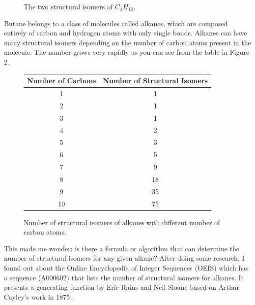 \documentclass{article}
\begin{document}
\begin{figure}[ht!]
\caption{The two structural isomers of $C_4H_{10}$.}
\end{figure}
Butane belongs to a class of molecules called alkanes, which are composed entirely of carbon and hydrogen atoms
with only single bonds. Alkanes can have many structural isomers depending on the
number of carbon atoms present in the molecule.
The number grows very rapidly as you can see from the table in Figure 2.
\begin{figure}[ht!]
\centering
\begin{tabular}{|c|c|}
\hline
Number of Carbons & Number of Structural Isomers \\
\hline
1 & 1 \\
2 & 1 \\
3 & 1 \\
4 & 2 \\
5 & 3 \\
6 & 5 \\
7 & 9 \\
8 & 18 \\
9 & 35 \\
10 & 75 \\
\hline
\end{tabular}
\caption{Number of structural isomers of alkanes with different number of carbon atoms.}
\end{figure}
This made me wonder: is there a formula or algorithm that can determine the number of structural isomers for any given alkane? After doing some research, I found out about the Online Encyclopedia of Integer Sequences (OEIS) which has a sequence (A000602) that lists the number of structural isomers for alkanes. It presents a generating function by Eric Rains and Neil Sloane based on Arthur Cayley's work in 1875 \cite{rains1999cayley}.
\end{document}
